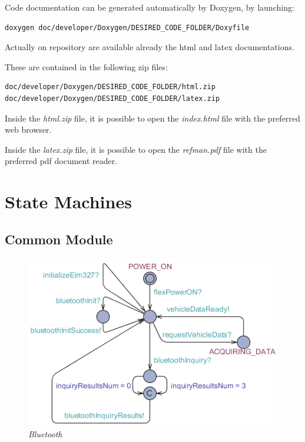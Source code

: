 \documentclass[paper=a4, fontsize=11pt]{scrartcl} %
\numberwithin{equation}{section} %
\numberwithin{figure}{section} %
\numberwithin{table}{section} %
\begin{document}
Code documentation can be generated automatically by Doxygen, by launching:

\begin{lstlisting}[language=bash]
doxygen doc/developer/Doxygen/DESIRED_CODE_FOLDER/Doxyfile
\end{lstlisting}

Actually on repository are available already the html and latex documentations.

These are contained in the following zip files:

\begin{lstlisting}[language=bash]
doc/developer/Doxygen/DESIRED_CODE_FOLDER/html.zip
doc/developer/Doxygen/DESIRED_CODE_FOLDER/latex.zip
\end{lstlisting}

Inside the \emph{html.zip} file, it is possible to open the \emph{index.html} file with the preferred web browser.

Inside the \emph{latex.zip} file, it is possible to open the \emph{refman.pdf} file with the preferred pdf document reader.

\section{State Machines}

\subsection{Common Module}

\begin{figure}[H]
  \centering
  \includegraphics[width=4.7in]{img/FLEX-OBD-LCD_bluetooth}
  \caption{\textit{Bluetooth}}
\end{figure}
\end{document}
